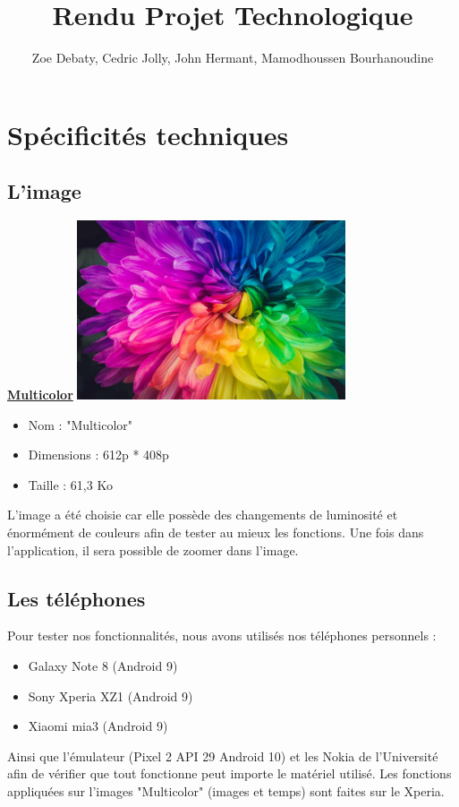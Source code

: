 \documentclass{article}
\begin{document}
\title{Rendu Projet Technologique}
\author{Zoe Debaty, Cedric Jolly, John Hermant, Mamodhoussen Bourhanoudine}
\maketitle

\newpage

\tableofcontents

\newpage

\section{Spécificités techniques}
\subsection{L'image}

\begin{center}
    \underline{\textbf{Multicolor}}
    \medbreak
    \includegraphics[width=300px]{./Images/Multicolor/base.jpg}
    \bigbreak
    \begin{itemize}
        \item Nom : "Multicolor"
        \item Dimensions : 612p * 408p
        \item Taille : 61,3 Ko
    \end{itemize}
\end{center}

L'image a été choisie car elle possède des changements de luminosité et énormément de couleurs afin de tester au mieux les fonctions.
Une fois dans l'application, il sera possible de zoomer dans l'image.

\subsection{Les téléphones}

Pour tester nos fonctionnalités, nous avons utilisés nos téléphones personnels :
\begin{itemize}
    \item Galaxy Note 8 (Android 9)
    \item Sony Xperia XZ1 (Android 9)
    \item Xiaomi mia3 (Android 9)
\end{itemize}
Ainsi que l'émulateur (Pixel 2 API 29 Android 10) et les Nokia de l'Université afin de vérifier que tout fonctionne peut importe le matériel utilisé. 
Les fonctions appliquées sur l'images "Multicolor" (images et temps) sont faites sur le Xperia. 
\newpage
\end{document}
